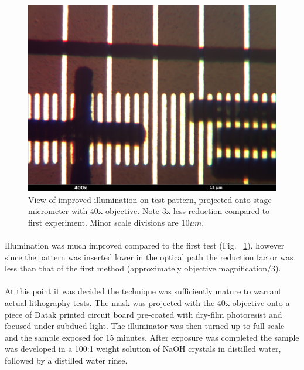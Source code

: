 \documentclass[twocolumn]{article}
\begin{document}
\begin{figure}[h]
\begin{center}
\includegraphics[scale=0.06]{mask004_annotated.jpg}
\end{center}
\caption{View of improved illumination on test pattern, projected onto stage micrometer with 40x objective. Note 3x
less reduction compared to first experiment. Minor scale divisions are $10 \mu m$.}
\label{second-test-close}
\end{figure}

\paragraph*{}
Illumination was much improved compared to the first test (Fig. ~\ref{second-test-close}), however since the pattern was
inserted lower in the optical path the reduction factor was less than that of the first method (approximately objective
magnification/3).

\paragraph*{}
At this point it was decided the technique was sufficiently mature to warrant actual lithography tests. The mask was 
projected with the 40x objective onto a piece of Datak printed circuit board pre-coated with dry-film photoresist and
focused under subdued light. The illuminator was then turned up to full scale and the sample exposed for 15 minutes.
After exposure was completed the sample was developed in a 100:1 weight solution of NaOH crystals in distilled water,
followed by a distilled water rinse.
\end{document}

